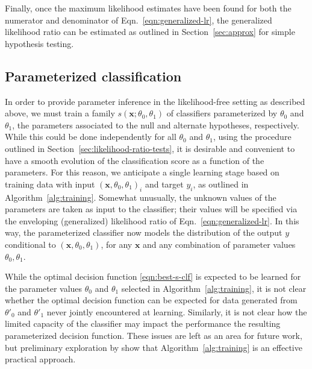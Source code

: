 \documentclass[12pt]{article}
\numberwithin{equation}{section}
\theoremstyle{plain}
\begin{document}
Finally, once the maximum likelihood estimates have been found for both the numerator
and denominator of Eqn.~\ref{eqn:generalized-lr}, the generalized likelihood
ratio can be estimated as outlined in Section~\ref{sec:approx}
for simple hypothesis testing.



\subsection{Parameterized classification}
\label{sec:param-clf}

In order to provide parameter inference in the likelihood-free setting as
described above, we must train a family $s(\mathbf{x};\theta_0,\theta_1)$ of
classifiers parameterized by $\theta_0$ and $\theta_1$, the parameters
associated to the null and alternate hypotheses, respectively. While this could
be done independently for all $\theta_0$ and $\theta_1$, using the procedure
outlined in Section~\ref{sec:likelihood-ratio-tests}, it is desirable and
convenient to have a smooth evolution of the classification score as a function
of the parameters. For this reason, we anticipate a single learning stage based
on training data with input $(\mathbf{x}, \theta_0, \theta_1)_i$ and target
$y_i$, as outlined in Algorithm~\ref{alg:training}.
Somewhat unusually, the
unknown values of the parameters are taken as input to the classifier; their
values will be specified via the enveloping (generalized) likelihood ratio of
Eqn.~\ref{eqn:generalized-lr}.  In this way, the parameterized classifier
now models the distribution of the output $y$ conditional to $(\mathbf{x}, \theta_0, \theta_1)$,
for any $\mathbf{x}$ and any combination of parameter values $\theta_0, \theta_1$.

While the optimal decision function \ref{eqn:best-s-clf} is expected to be
learned for the parameter values $\theta_0$ and $\theta_1$ selected in
Algorithm~\ref{alg:training}, it is not clear whether the optimal decision
function can be expected for data generated from  $\theta'_0$ and $\theta'_1$
never jointly encountered at learning. Similarly, it is not clear how the
limited capacity of the classifier may impact the performance the resulting
parameterized decision function. These issues are left as an area for future
work, but preliminary exploration by \cite{Baldi:2016fzo} show that
Algorithm~\ref{alg:training} is an effective practical approach.
\end{document}
